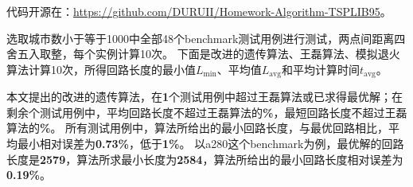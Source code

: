 \documentclass[12pt]{ctexart}
\begin{document}
代码开源在：\url{https://github.com/DURUII/Homework-Algorithm-TSPLIB95}。

选取城市数小于等于1000中全部48个benchmark测试用例进行测试，两点间距离四舍五入取整，每个实例计算10次。
下面是改进的遗传算法、王磊算法、模拟退火算法计算10次，所得回路长度的最小值$L_{\min}$、平均值$L_{\text{avg}}$和平均计算时间$t_{\text{avg}}$。

本文提出的改进的遗传算法，在\textbf{1}个测试用例中超过王磊算法或已求得最优解；在剩余\textbf{}个测试用例中，平均回路长度不超过王磊算法的\textbf{\%}，最短回路长度不超过王磊算法的\textbf{\%}。
所有测试用例中，算法所给出的最小回路长度，与最优回路相比，平均最小相对误差为\textbf{0.73\%}，低于\textbf{1\%}。
以a280这个benchmark为例，最优解的回路长度是\textbf{2579}，算法所求最小长度为\textbf{2584}，算法所给出的最小回路长度相对误差为\textbf{0.19\%}。
\end{document}
